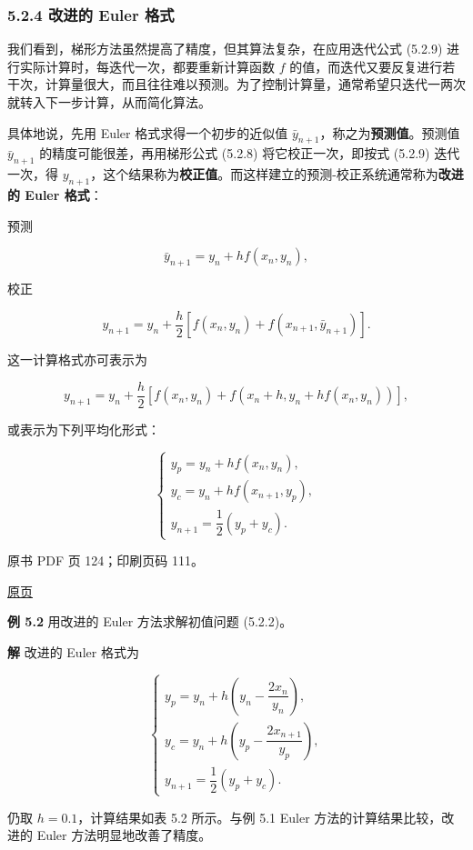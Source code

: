 \subsubsection{5.2.4 改进的 Euler 格式}\label{ch05a-ux6539ux8fdbux7684-euler-ux683cux5f0f}

我们看到，梯形方法虽然提高了精度，但其算法复杂，在应用迭代公式 (5.2.9) 进行实际计算时，每迭代一次，都要重新计算函数 \(f\) 的值，而迭代又要反复进行若干次，计算量很大，而且往往难以预测。为了控制计算量，通常希望只迭代一两次就转入下一步计算，从而简化算法。

具体地说，先用 Euler 格式求得一个初步的近似值 \(\bar y_{n+1}\)，称之为\textbf{预测值}。预测值 \(\bar y_{n+1}\) 的精度可能很差，再用梯形公式 (5.2.8) 将它校正一次，即按式 (5.2.9) 迭代一次，得 \(y_{n+1}\)，这个结果称为\textbf{校正值}。而这样建立的预测-校正系统通常称为\textbf{改进的 Euler 格式}：

预测

\[
\bar y_{n+1}=y_n+hf(x_n,y_n),\tag{5.2.10}
\]

校正

\[
y_{n+1}=y_n+\frac{h}{2}[f(x_n,y_n)+f(x_{n+1},\bar y_{n+1})].\tag{5.2.11}
\]

这一计算格式亦可表示为

\[
y_{n+1}=y_n+\frac{h}{2}[f(x_n,y_n)+f(x_n+h,y_n+hf(x_n,y_n))],\tag{5.2.12}
\]

或表示为下列平均化形式：

\[
\begin{cases}
y_p=y_n+hf(x_n,y_n),\\
y_c=y_n+hf(x_{n+1},y_p),\\
y_{n+1}=\dfrac{1}{2}(y_p+y_c).
\end{cases}
\]

\clearpage

原书 PDF 页 124；印刷页码 111。

\href{source-images/pdf-124.jpeg}{原页}

\textbf{例 5.2} 用改进的 Euler 方法求解初值问题 (5.2.2)。

\textbf{解} 改进的 Euler 格式为

\[
\begin{cases}
y_p=y_n+h\left(y_n-\dfrac{2x_n}{y_n}\right),\\
y_c=y_n+h\left(y_p-\dfrac{2x_{n+1}}{y_p}\right),\\
y_{n+1}=\dfrac{1}{2}(y_p+y_c).
\end{cases}
\]

仍取 \(h=0.1\)，计算结果如表 5.2 所示。与例 5.1 Euler 方法的计算结果比较，改进的 Euler 方法明显地改善了精度。

